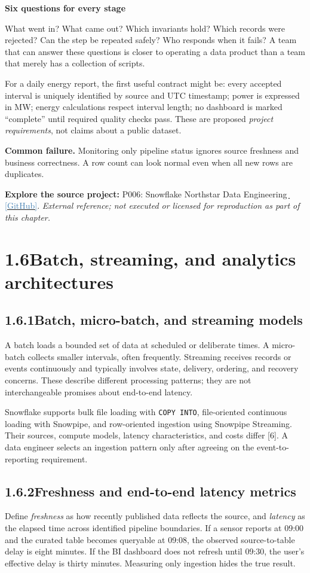 \documentclass[11pt,twoside]{article}
\newcommand{\topic}[2]{\subsection*{#1\quad #2}}
\newcommand{\repo}[2]{\par\begingroup\small\sffamily\color{inkgray}\textbf{Explore the source project:} #1\,\href{#2}{\,\textcolor{steelblue}{[GitHub]}}. \textit{External reference; not executed or licensed for reproduction as part of this chapter.}\par\endgroup}
\begin{document}
\begin{insight}
\textbf{Six questions for every stage}\par
What went in? What came out? Which invariants hold? Which records were rejected? Can the step be repeated safely? Who responds when it fails? A team that can answer these questions is closer to operating a data product than a team that merely has a collection of scripts.
\end{insight}

For a daily energy report, the first useful contract might be: every accepted interval is uniquely identified by source and UTC timestamp; power is expressed in MW; energy calculations respect interval length; no dashboard is marked ``complete'' until required quality checks pass. These are proposed \emph{project requirements}, not claims about a public dataset.

\textbf{Common failure.} Monitoring only pipeline status ignores source freshness and business correctness. A row count can look normal even when all new rows are duplicates.
\repo{P006: Snowflake Northstar Data Engineering}{https://github.com/Snowflake-Labs/sfguide-snowflake-northstar-data-engineering}

\section*{1.6\quad Batch, streaming, and analytics architectures}
\topic{1.6.1}{Batch, micro-batch, and streaming models}
A batch loads a bounded set of data at scheduled or deliberate times. A micro-batch collects smaller intervals, often frequently. Streaming receives records or events continuously and typically involves state, delivery, ordering, and recovery concerns. These describe different processing patterns; they are not interchangeable promises about end-to-end latency.

Snowflake supports bulk file loading with \texttt{COPY INTO}, file-oriented continuous loading with Snowpipe, and row-oriented ingestion using Snowpipe Streaming. Their sources, compute models, latency characteristics, and costs differ [6]. A data engineer selects an ingestion pattern only after agreeing on the event-to-reporting requirement.

\topic{1.6.2}{Freshness and end-to-end latency metrics}
Define \emph{freshness} as how recently published data reflects the source, and \emph{latency} as the elapsed time across identified pipeline boundaries. If a sensor reports at 09:00 and the curated table becomes queryable at 09:08, the observed source-to-table delay is eight minutes. If the BI dashboard does not refresh until 09:30, the user's effective delay is thirty minutes. Measuring only ingestion hides the true result.
\end{document}
